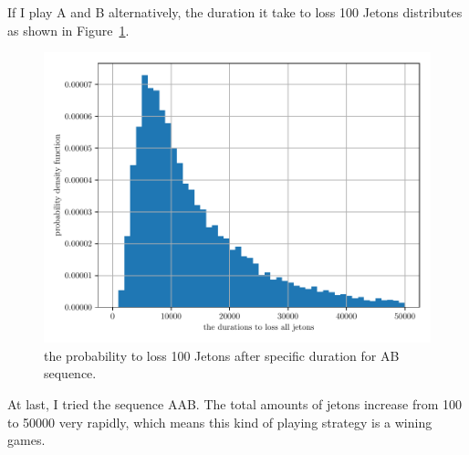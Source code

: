 \documentclass[paper=a4, fontsize=11pt]{scrartcl} %
\numberwithin{equation}{section} %
\numberwithin{figure}{section} %
\numberwithin{table}{section} %
\begin{document}
If I play A and B alternatively, the duration it take to loss 100 Jetons distributes as shown in Figure~\ref{fig:parrondos_2}.\par
\begin{figure}[!ht]
	\centering
	\includegraphics[width=0.5\linewidth]{figure_3_c.pdf}
	\caption{the probability to loss 100 Jetons after specific duration for AB sequence.}
	\label{fig:parrondos_2}
\end{figure}
At last, I tried the sequence AAB. The total amounts of jetons increase from 100 to 50000 very rapidly, which means this kind of playing strategy is a wining games.\par

\end{document}
